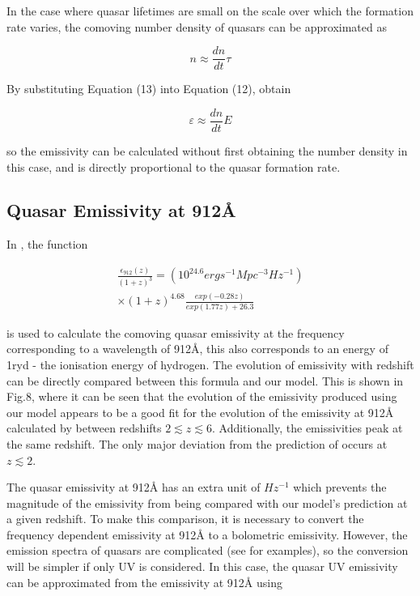 \documentclass[12pt, twocolumn]{report}%
\begin{document}
In the case where quasar lifetimes are small on the scale over which the formation rate varies, the comoving number density of quasars can be approximated as

\begin{equation}
    n\approx\frac{dn}{dt}\tau
\end{equation}

\noindent By substituting Equation (13) into Equation (12), obtain

\begin{equation}
    \varepsilon\approx\frac{dn}{dt}E
\end{equation}

\noindent so the emissivity can be calculated without first obtaining the number density in this case, and is directly proportional to the quasar formation rate.

\subsection{Quasar Emissivity at 912\AA}

In \cite{Haardt_Madau}, the function

\begin{multline}
    \frac{\epsilon_{912}(z)}{(1+z)^3}=(10^{24.6}erg s^{-1}Mpc^{-3}Hz^{-1})\\
    \times(1+z)^{4.68}\frac{exp(-0.28z)}{exp(1.77z)+26.3}
\end{multline}

\noindent is used to calculate the comoving quasar emissivity at the frequency corresponding to a wavelength of 912\AA, this also corresponds to an energy of 1ryd - the ionisation energy of hydrogen. The evolution of emissivity with redshift can be directly compared between this formula and our model. This is shown in Fig.8, where it can be seen that the evolution of the emissivity produced using our model appears to be a good fit for the evolution of the emissivity at 912\AA \: calculated by \cite{Haardt_Madau} between redshifts $2\lesssim z\lesssim6$. Additionally, the emissivities peak at the same redshift. The only major deviation from the prediction of \citeauthor{Haardt_Madau} occurs at $z\lesssim2$.\par

The quasar emissivity at 912\AA \: has an extra unit of $Hz^{-1}$ which prevents the magnitude of the emissivity from being compared with our model's prediction at a given redshift. To make this comparison, it is necessary to convert the frequency dependent emissivity at 912\AA \: to a bolometric emissivity. However, the emission spectra of quasars are complicated (see \cite{QSO_Spectrum} for examples), so the conversion will be simpler if only UV is considered. In this case, the quasar UV emissivity can be approximated from the emissivity at 912\AA \: using
\end{document}

